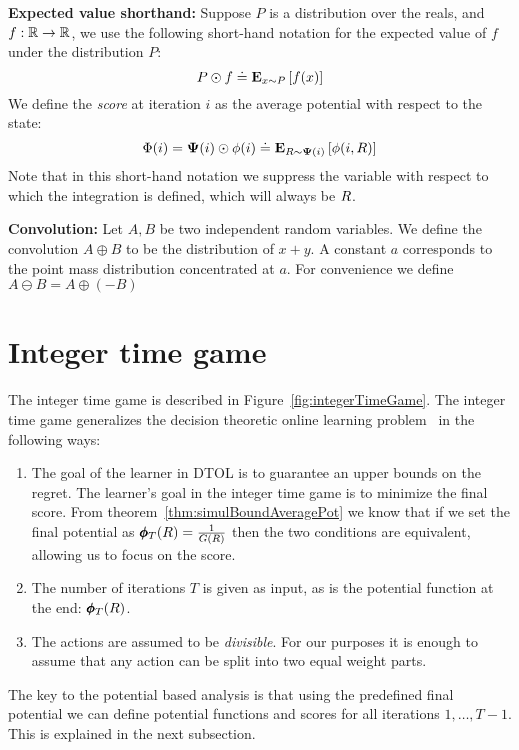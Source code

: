 \documentclass{article}[12pt]
\begin{document}
{\bf Expected value shorthand:} Suppose $P$ is a distribution over the reals, and $f:\mathbb{R}
\to \mathbb{R}$, we use the following short-hand notation for the expected
value of $f$ under the distribution $P$:
\[ P \odot f \doteq {\bf E}_{x \sim P}\left[ f(x) \right]  \]
We define the {\em score} at iteration $i$ as the average potential
with respect to the state:
\[ \Phi(i) = {\bf \Psi}(i) \odot \phi(i) \doteq {\bf E}_{R \sim {\bf \Psi}(i)}\left[ \phi(i,R) \right]\]
Note that in this short-hand notation we suppress the variable with
respect to which the integration is defined, which will always be $R$.

{\bf Convolution:} Let $A,B$ be two independent random variables. We define the
convolution $A \oplus B$ to be the distribution of $x+y$. A constant
$a$ corresponds to the point mass distribution concentrated at
$a$. For convenience we define $A \ominus B = A \oplus (-B)$


\section{Integer time game}
\label{sec:int-time-game}
The integer time game is described in
Figure~\ref{fig:integerTimeGame}.  The integer time game generalizes
the decision theoretic online learning problem~\cite{FreundSc97} in
the following ways:
\begin{enumerate}
\item The goal of the learner in DTOL is to guarantee an upper bounds
  on the regret. The learner's goal in the integer time game is to
  minimize the final score. From theorem~\ref{thm:simulBoundAveragePot} we know that if
  we set the final potential as $\pmb{\phi}_{T}(R) = \frac{1}{G(R)}$ then the two
  conditions are equivalent, allowing us to focus on the score.
\item The number of iterations $T$ is given as input, as is the
  potential function at the end: $\pmb{\phi}_{T}(R)$.
\item The actions are assumed to be {\em divisible}. For our purposes
it is enough to assume that any action can be split into two equal
weight parts.
\end{enumerate}

The key to the potential based analysis is that using the predefined
final potential we can define potential functions and scores for all
iterations $1,\ldots,T-1$. This is explained in the next subsection.
\end{document}
